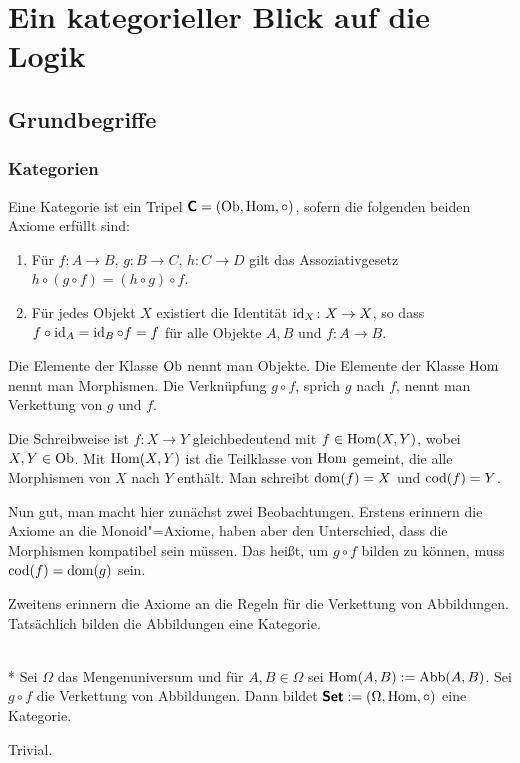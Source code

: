 
\chapter{Ein kategorieller Blick auf die Logik}

\section{Grundbegriffe}

\subsection{Kategorien}

\begin{Definition}[Kategorie]
Eine Kategorie ist ein Tripel $\textsf{\textbf{C}} = (\operatorname{Ob},\operatorname{Hom},{\circ})$,
sofern die folgenden beiden Axiome erfüllt sind:
\begin{enumerate}
\item Für $f\colon A\to B$, $g\colon B\to C$, $h\colon C\to D$ gilt
das Assoziativgesetz\\
$h\circ (g\circ f) = (h\circ g)\circ f$.
\item Für jedes Objekt $X$ existiert die Identität $\operatorname{id}_X\colon X\to X$,
so dass $f\circ\operatorname{id}_A = \operatorname{id}_B\circ f=f$ für alle Objekte $A,B$
und $f\colon A\to B$.
\end{enumerate}
\end{Definition}
Die Elemente der Klasse $\operatorname{Ob}$ nennt man Objekte. Die
Elemente der Klasse $\operatorname{Hom}$ nennt man Morphismen. Die
Verknüpfung $g\circ f$, sprich $g$ nach $f$, nennt man Verkettung
von $g$ und $f$.

Die Schreibweise ist $f\colon X\to Y$ gleichbedeutend mit
$f\in\operatorname{Hom}(X,Y)$, wobei $X,Y\in\operatorname{Ob}$.
Mit $\operatorname{Hom}(X,Y)$ ist die Teilklasse von
$\operatorname{Hom}$ gemeint, die alle Morphismen von $X$ nach $Y$
enthält. Man schreibt $\operatorname{dom}(f) = X$ und $\operatorname{cod}(f) = Y$.

Nun gut, man macht hier zunächst zwei Beobachtungen. Erstens
erinnern die Axiome an die Monoid"=Axiome, haben aber den Unterschied,
dass die Morphismen kompatibel sein müssen. Das heißt, um $g\circ f$
bilden zu können, muss $\operatorname{cod}(f)=\operatorname{dom}(g)$ sein.

Zweitens erinnern die Axiome an die Regeln für die Verkettung
von Abbildungen. Tatsächlich bilden die Abbildungen eine Kategorie.

\begin{Satz}\mbox{}\\*
Sei $\Omega$ das Mengenuniversum und für $A,B\in\Omega$ sei
$\operatorname{Hom}(A,B):=\operatorname{Abb}(A,B)$. Sei $g\circ f$ die Verkettung
von Abbildungen. Dann bildet $\textsf{\textbf{Set}}:=(\Omega,\operatorname{Hom},\circ)$
eine Kategorie.
\end{Satz}
 Trivial.\;\qedsymbol

